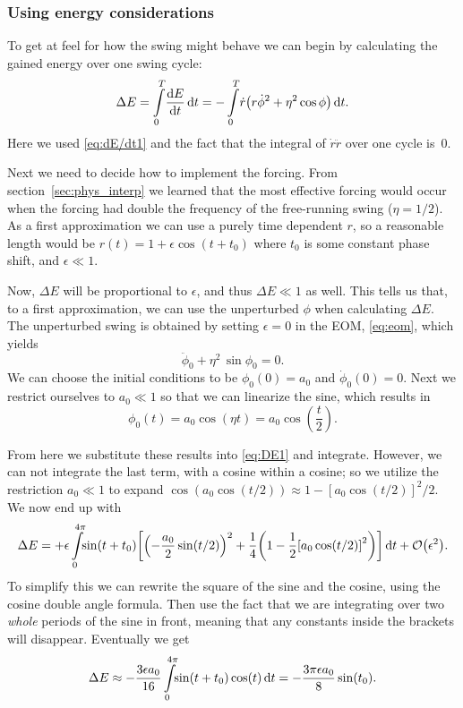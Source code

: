 \documentclass[11pt,letter, swedish, english,%
]{article}
\begin{document}
\subsubsection{Using energy considerations}
\newcommand{\DE}{\Delta{E}}
To get at feel for how the swing might behave we can begin by
calculating the gained energy over one swing cycle:
\begin{equation}\label{eq:DE1}
\DE=\int_0^T\!\dv{E}{t}\id{t}
=-\int_0^T\! \dot{r}\qty(r\dot{\phi}^2 + \eta^2\cos\phi)\id{t}.
\end{equation}
Here we used \eqref{eq:dE/dt1} and the fact that the integral of
$\dot{r}\ddot{r}$ over one cycle is~$0$. 

Next we need to decide how to implement the forcing. From
section~\ref{sec:phys_interp} we learned that the most effective
forcing would occur when the forcing had double the frequency of the
free-running swing ($\eta=1/2$). As a first approximation we can use a purely time
dependent $r$, so a reasonable length would be
$ %
r(t)=1+\epsilon\cos(t+t_0)
$ %
where $t_0$ is some constant phase shift, and $\epsilon\ll1$. 

Now, $\DE$ will be proportional to $\epsilon$, and thus $\DE\ll1$ as
well. This tells us that, to a first approximation, we can use the
unperturbed $\phi$ when calculating $\DE$. The unperturbed swing is
obtained by setting $\epsilon=0$ in the EOM, \eqref{eq:eom}, which
yields
\begin{equation}
\ddot\phi_0+\eta^2\,\sin\phi_0=0.
\end{equation}
We can choose the initial conditions to be $\phi_0(0)=a_0$ and
$\dot\phi_0(0)=0$. Next we restrict ourselves to $a_0\ll1$ so that we
can linearize the sine, which results in
\begin{equation}
\phi_0(t)=a_0\cos(\eta t)=a_0\cos(\frac{t}{2}).
\end{equation}

From here we substitute these results into \eqref{eq:DE1} and
integrate. However, we can not integrate the last term, with a cosine
within a cosine; so we utilize the restriction $a_0\ll1$ to expand
$\cos(a_0\cos(t/2))\approx1-[a_0\cos(t/2)]^2/2$. We now end up with
\begin{equation}
\DE=+\epsilon\int_0^{4\pi}\!\!\sin(t+t_0)
\qty[\qty(-\frac{a_0}{2}\sin(t/2))^2
+\frac{1}{4}\qty(1-\frac{1}{2}\qty[a_0\cos(t/2)]^2)
]\id{t}+\order{\epsilon^2}.
\end{equation}
To simplify this we can rewrite the square of the sine and the cosine,
using the cosine double angle formula. Then use the fact that we are
integrating over two \emph{whole} periods of the sine in front,
meaning that any constants inside the brackets will
disappear. Eventually we get
\begin{equation}\label{eq:DE_t0}
\DE\approx
-\frac{3\epsilon a_0}{16}\int_0^{4\pi}\!\!\sin(t+t_0)\cos(t)\id{t}
=-\frac{3\pi\epsilon a_0}{8}\sin(t_0).
\end{equation}
\end{document}
